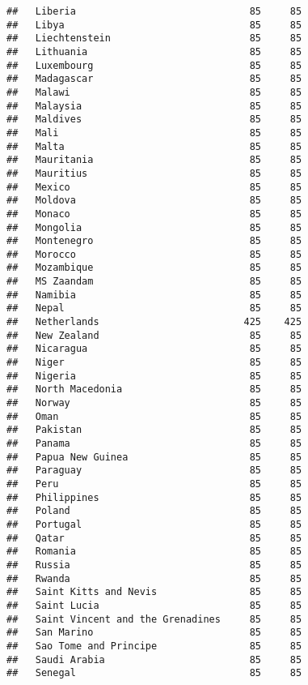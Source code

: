 \documentclass[]{article}
\begin{document}
\begin{verbatim}
##   Liberia                              85     85
##   Libya                                85     85
##   Liechtenstein                        85     85
##   Lithuania                            85     85
##   Luxembourg                           85     85
##   Madagascar                           85     85
##   Malawi                               85     85
##   Malaysia                             85     85
##   Maldives                             85     85
##   Mali                                 85     85
##   Malta                                85     85
##   Mauritania                           85     85
##   Mauritius                            85     85
##   Mexico                               85     85
##   Moldova                              85     85
##   Monaco                               85     85
##   Mongolia                             85     85
##   Montenegro                           85     85
##   Morocco                              85     85
##   Mozambique                           85     85
##   MS Zaandam                           85     85
##   Namibia                              85     85
##   Nepal                                85     85
##   Netherlands                         425    425
##   New Zealand                          85     85
##   Nicaragua                            85     85
##   Niger                                85     85
##   Nigeria                              85     85
##   North Macedonia                      85     85
##   Norway                               85     85
##   Oman                                 85     85
##   Pakistan                             85     85
##   Panama                               85     85
##   Papua New Guinea                     85     85
##   Paraguay                             85     85
##   Peru                                 85     85
##   Philippines                          85     85
##   Poland                               85     85
##   Portugal                             85     85
##   Qatar                                85     85
##   Romania                              85     85
##   Russia                               85     85
##   Rwanda                               85     85
##   Saint Kitts and Nevis                85     85
##   Saint Lucia                          85     85
##   Saint Vincent and the Grenadines     85     85
##   San Marino                           85     85
##   Sao Tome and Principe                85     85
##   Saudi Arabia                         85     85
##   Senegal                              85     85

\end{verbatim}
\end{document}
